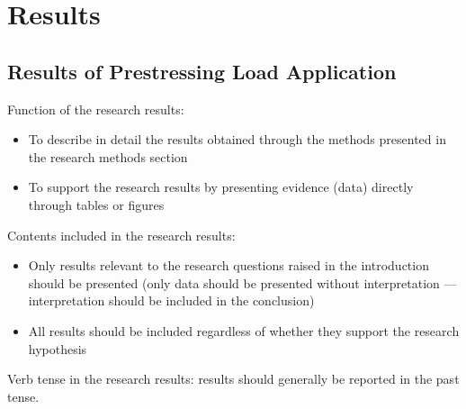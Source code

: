 \chapter{Results}

\section{Results of Prestressing Load Application}

Function of the research results:
\begin{itemize}[leftmargin=3em, itemsep=2pt]
  \item To describe in detail the results obtained through the methods presented in the research methods section
  \item To support the research results by presenting evidence (data) directly through tables or figures
\end{itemize}

Contents included in the research results:
\begin{itemize}[leftmargin=3em, itemsep=2pt]
  \item Only results relevant to the research questions raised in the introduction should be presented
        (only data should be presented without interpretation --- interpretation should be included in the conclusion)
  \item All results should be included regardless of whether they support the research hypothesis
\end{itemize}

Verb tense in the research results: results should generally be reported in the past tense.